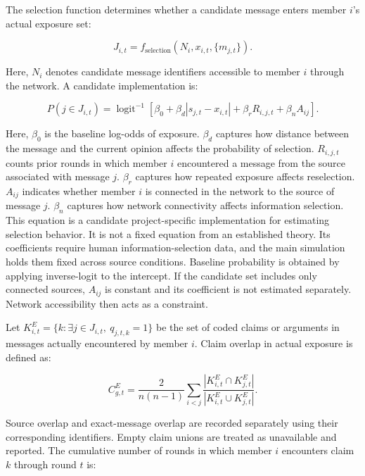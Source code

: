 \documentclass[11pt,a4paper]{article}
\begin{document}
The selection function determines whether a candidate message enters member $i$'s actual exposure set:

\begin{equation*}
J_{i,t}
=
f_{\text{selection}}
(N_i,x_{i,t},\{m_{j,t}\}).
\end{equation*}

Here, $N_i$ denotes candidate message identifiers accessible to member $i$ through the network. A candidate implementation is:

\begin{equation*}
P(j\in J_{i,t})
=
\operatorname{logit}^{-1}
\left[
\beta_0
+
\beta_d|s_{j,t}-x_{i,t}|
+
\beta_rR_{i,j,t}
+
\beta_nA_{ij}
\right].
\end{equation*}

Here, $\beta_0$ is the baseline log-odds of exposure. $\beta_d$ captures how distance between the message and the current opinion affects the probability of selection. $R_{i,j,t}$ counts prior rounds in which member $i$ encountered a message from the source associated with message $j$. $\beta_r$ captures how repeated exposure affects reselection. $A_{ij}$ indicates whether member $i$ is connected in the network to the source of message $j$. $\beta_n$ captures how network connectivity affects information selection. This equation is a candidate project-specific implementation for estimating selection behavior. It is not a fixed equation from an established theory. Its coefficients require human information-selection data, and the main simulation holds them fixed across source conditions. Baseline probability is obtained by applying inverse-logit to the intercept. If the candidate set includes only connected sources, $A_{ij}$ is constant and its coefficient is not estimated separately. Network accessibility then acts as a constraint.

Let $K^{E}_{i,t}=\{k:\exists j\in J_{i,t},\ q_{j,t,k}=1\}$ be the set of coded claims or arguments in messages actually encountered by member $i$. Claim overlap in actual exposure is defined as:

\begin{equation*}
C^{E}_{g,t}
=
\frac{2}{n(n-1)}
\sum_{i<j}
\frac{|K^{E}_{i,t}\cap K^{E}_{j,t}|}
{|K^{E}_{i,t}\cup K^{E}_{j,t}|}.
\end{equation*}

Source overlap and exact-message overlap are recorded separately using their corresponding identifiers. Empty claim unions are treated as unavailable and reported. The cumulative number of rounds in which member $i$ encounters claim $k$ through round $t$ is:
\end{document}
